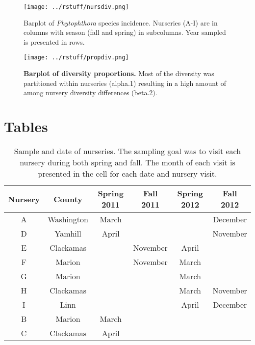 \documentclass[12pt]{article}
\begin{document}
\begin{figure}[!ht]
\begin{center}
\texttt{[image: ../rstuff/nursdiv.png]}
\end{center}
\caption{
Barplot of \emph{Phytophthora} species incidence.  Nurseries (A-I) are in columns with season (fall and spring) in subcolumns.  Year sampled is presented in rows.
}
\label{fig:nursdiv}
\end{figure}
\clearpage

\begin{figure}[!ht]
\begin{center}
\texttt{[image: ../rstuff/propdiv.png]}
\end{center}
\caption{
{\bf Barplot of diversity proportions.} Most of the diversity was partitioned within nurseries (alpha.1) resulting in a high amount of among nursery diversity differences (beta.2).
}
\label{fig:propdiv}
\end{figure}
\clearpage

\section*{Tables}

\begin{table}[!ht]
\caption{Sample and date of nurseries.  The sampling goal was to visit each nursery during both spring and fall.  The month of each visit is presented in the cell for each date and nursery visit.}
\begin{tabular}{cccccc}
\hline
\textbf{Nursery} & \textbf{County} & \textbf{Spring 2011} & \textbf{Fall 2011} & \textbf{Spring 2012} & \textbf{Fall 2012} \\
\hline
A & Washington & March & & & December \\
D & Yamhill & April & & & November \\
E & Clackamas & & November & April & \\
F & Marion & & November & March & \\
G & Marion & &  & March & \\
H & Clackamas & & & March & November \\
I & Linn & & & April & December \\
B & Marion & March & & & \\
C & Clackamas & April & & & \\
\hline
\end{tabular}
\label{tab:sample}
\end{table}
\end{document}
